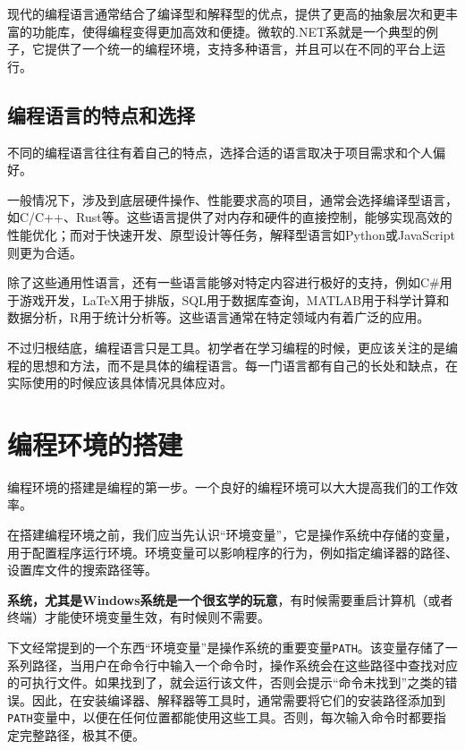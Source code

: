 \documentclass[../main.tex]{subfiles}
\begin{document}
现代的编程语言通常结合了编译型和解释型的优点，提供了更高的抽象层次和更丰富的功能库，使得编程变得更加高效和便捷。微软的.NET系就是一个典型的例子，它提供了一个统一的编程环境，支持多种语言，并且可以在不同的平台上运行。

\subsection{编程语言的特点和选择}

不同的编程语言往往有着自己的特点，选择合适的语言取决于项目需求和个人偏好。

一般情况下，涉及到底层硬件操作、性能要求高的项目，通常会选择编译型语言，如C/C++、Rust等。这些语言提供了对内存和硬件的直接控制，能够实现高效的性能优化；而对于快速开发、原型设计等任务，解释型语言如Python或JavaScript则更为合适。

除了这些通用性语言，还有一些语言能够对特定内容进行极好的支持，例如C\#用于游戏开发，LaTeX用于排版，SQL用于数据库查询，MATLAB用于科学计算和数据分析，R用于统计分析等。这些语言通常在特定领域内有着广泛的应用。

不过归根结底，编程语言只是工具。初学者在学习编程的时候，更应该关注的是编程的思想和方法，而不是具体的编程语言。每一门语言都有自己的长处和缺点，在实际使用的时候应该具体情况具体应对。

\section{编程环境的搭建}

编程环境的搭建是编程的第一步。一个良好的编程环境可以大大提高我们的工作效率。

在搭建编程环境之前，我们应当先认识“环境变量”，它是操作系统中存储的变量，用于配置程序运行环境。环境变量可以影响程序的行为，例如指定编译器的路径、设置库文件的搜索路径等。

\begin{tip}
  \textbf{系统，尤其是Windows系统是一个很玄学的玩意}，有时候需要重启计算机（或者终端）才能使环境变量生效，有时候则不需要。
\end{tip}

\begin{note}
  下文经常提到的一个东西“环境变量”是操作系统的重要变量\texttt{PATH}。该变量存储了一系列路径，当用户在命令行中输入一个命令时，操作系统会在这些路径中查找对应的可执行文件。如果找到了，就会运行该文件，否则会提示“命令未找到”之类的错误。因此，在安装编译器、解释器等工具时，通常需要将它们的安装路径添加到\texttt{PATH}变量中，以便在任何位置都能使用这些工具。否则，每次输入命令时都要指定完整路径，极其不便。
\end{note}
\end{document}
